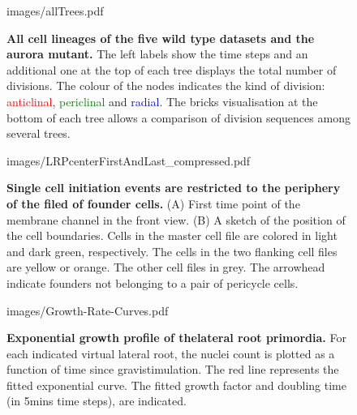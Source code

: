 \documentclass[11pt,a4paper, final]{article}
\begin{document}
\clearpage
%
%
\begin{figure}
	\begin{center}
		\begin{overpic}[width=1.\linewidth]{images/allTrees.pdf}
		\end{overpic}
\caption[All cell lineages of the five wild type datasets and the aurora mutant.]
{
{\bf All cell lineages of the five wild type datasets and the aurora mutant.} The left labels show the time steps and an additional one at the top of each tree displays the total number of divisions. The colour of the nodes indicates the kind of division: \textcolor{red}{anticlinal}, \textcolor{green}{periclinal} and \textcolor{blue}{radial}. The bricks visualisation at the bottom of each tree allows a comparison of division sequences among several trees.
}
	\label{fig:allTrees}
	\end{center}
\end{figure}
\clearpage
%
\begin{figure}[htbp]
	\begin{center}
	\begin{overpic}[width=0.5\linewidth]{images/LRPcenterFirstAndLast_compressed.pdf}
	\end{overpic}
\caption[Single cell initiation events are restricted to the periphery of the filed of founder cells.]
{{\bf Single cell initiation events are restricted to the periphery of the filed of founder cells.} (A) First time point of the membrane channel in the front view. (B) A sketch of the position of the cell boundaries. Cells in the master cell file are colored in light and dark green, respectively. The cells in the two flanking cell files are yellow or orange. The other cell files in grey. The arrowhead indicate founders not belonging to a pair of pericycle cells.}
	\label{fig:founderstop}
	\end{center}
\end{figure}
%
\clearpage
%
%
\begin{figure}[htbp]
	\begin{center}
	\begin{overpic}[width=1.\linewidth]{images/Growth-Rate-Curves.pdf}
	\end{overpic}
\caption[Exponential growth profile of the lateral root primordia.]
{{\bf Exponential growth profile of thelateral root primordia.} For each indicated virtual lateral root, the nuclei count  is plotted as a function of time since gravistimulation. The red line represents the fitted exponential curve. The fitted growth factor and doubling time (in 5mins time steps), are indicated.}
	\label{fig:growthcurves}
	\end{center}
\end{figure}
\end{document}
